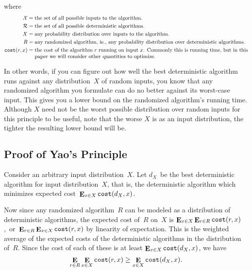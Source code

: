 where \begin{align*}
\mathcal{X} =&\; \text{the set of all possible inputs to the algorithm.}
\\
\mathcal{R} =&\; \text{the set of all possible deterministic algorithms.}
\\
X =&\; \text{any probability distribution over inputs to the algorithm.}
\\
R =&\; \text{\parbox[t]{5.5in}{any randomized algorithm, ie., any probability distribution over deterministic algorithms.}}
\\
\texttt{cost}(r, x) =&\; \text{\parbox[t]{5.5in}{the cost of the algorithm~$r$ running on input~$x$. Commonly this is running time, but in this paper we will consider other quantities to optimize.}}
\end{align*}

In other words, if you can figure out how well the best deterministic algorithm runs against any distribution~$X$ of random inputs, you know that any randomized algorithm you formulate can do no better against its worst-case input. This gives you a lower bound on the randomized algorithm's running time.
Although $X$ need not be the worst possible distribution over random inputs for this principle to be useful, note that the worse $X$ is as an input distribution, the tighter the resulting lower bound will be. 


\subsection{Proof of Yao's Principle}

Consider an arbitrary input distribution~$X$. Let $d_X$~be the best deterministic algorithm for input distribution~$X$, that is, the deterministic algorithm which minimizes expected cost~$\mathop{\mathbf{E}}_{x\in X}\texttt{cost}(d_X,x)$.

Now since any randomized algorithm~$R$ can be modeled as a distribution of deterministic algorithms, the expected cost of~$R$ on~$X$ is $\mathop{\mathbf{E}}_{x\in X}\mathop{\mathbf{E}}_{r\in R}\texttt{cost}(r,x)$,~or~$\mathop{\mathbf{E}}_{r\in R}\mathop{\mathbf{E}}_{x\in X}\texttt{cost}(r,x)$ by linearity of expectation. This is the weighted average of the expected costs of the deterministic algorithms in the distribution of~$R$. Since the cost of each of these is at least $\mathop{\mathbf{E}}_{x\in X}\texttt{cost}(d_X,x)$, we have
\[\mathop{\mathbf{E}}_{r\in R}\mathop{\mathbf{E}}_{x\in X}\texttt{cost}(r,x) \ge \mathop{\mathbf{E}}_{x\in X}\texttt{cost}(d_X,x).\]

